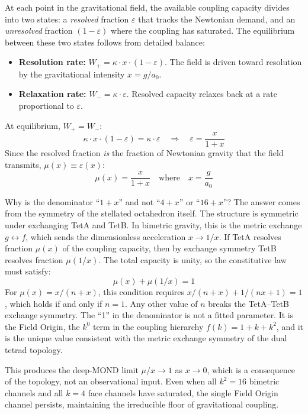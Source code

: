 \documentclass[aps,prd,preprint,superscriptaddress,showpacs,preprintnumbers,amsmath,amssymb,nofootinbib]{revtex4-2}
\begin{document}
At each point in the gravitational field, the available coupling capacity divides into two states: a \emph{resolved} fraction $\varepsilon$ that tracks the Newtonian demand, and an \emph{unresolved} fraction $(1 - \varepsilon)$ where the coupling has saturated. The equilibrium between these two states follows from detailed balance:
\begin{itemize}
\item \textbf{Resolution rate:} $W_+ = \kappa \cdot x \cdot (1 - \varepsilon)$. The field is driven toward resolution by the gravitational intensity $x = g/a_0$.
\item \textbf{Relaxation rate:} $W_- = \kappa \cdot \varepsilon$. Resolved capacity relaxes back at a rate proportional to $\varepsilon$.
\end{itemize}
At equilibrium, $W_+ = W_-$:
\begin{equation}
\kappa \cdot x \cdot (1 - \varepsilon) = \kappa \cdot \varepsilon \quad \Longrightarrow \quad \varepsilon = \frac{x}{1 + x}
\end{equation}
Since the resolved fraction \emph{is} the fraction of Newtonian gravity that the field transmits, $\mu(x) \equiv \varepsilon(x)$:
\begin{equation}
\mu(x) = \frac{x}{1+x} \quad \text{where} \quad x = \frac{g}{a_0}
\label{eq:mu-dm}
\end{equation}

Why is the denominator ``$1 + x$'' and not ``$4 + x$'' or ``$16 + x$''? The answer comes from the symmetry of the stellated octahedron itself. The structure is symmetric under exchanging TetA and TetB. In bimetric gravity, this is the metric exchange $g \leftrightarrow f$, which sends the dimensionless acceleration $x \to 1/x$. If TetA resolves fraction $\mu(x)$ of the coupling capacity, then by exchange symmetry TetB resolves fraction $\mu(1/x)$. The total capacity is unity, so the constitutive law must satisfy:
\begin{equation}
\mu(x) + \mu(1/x) = 1
\end{equation}
For $\mu(x) = x/(n + x)$, this condition requires $x/(n+x) + 1/(nx + 1) = 1$, which holds if and only if $n = 1$. Any other value of $n$ breaks the TetA--TetB exchange symmetry. The ``1'' in the denominator is not a fitted parameter. It is the Field Origin, the $k^0$ term in the coupling hierarchy $f(k) = 1 + k + k^2$, and it is the unique value consistent with the metric exchange symmetry of the dual tetrad topology.

This produces the deep-MOND limit $\mu/x \to 1$ as $x \to 0$, which is a consequence of the topology, not an observational input. Even when all $k^2 = 16$ bimetric channels and all $k = 4$ face channels have saturated, the single Field Origin channel persists, maintaining the irreducible floor of gravitational coupling.
\end{document}
